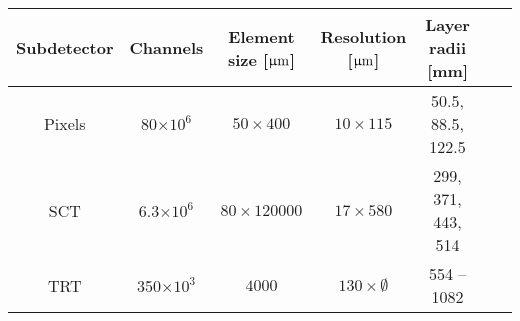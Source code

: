 \begin{tabular}{c|cccccc}
  Subdetector & Channels           & Element size [$\upmu\text{m}$] & Resolution [$\upmu\text{m}$] & Layer radii [mm]   \\
  \hline
  Pixels      & 80$\times 10^{6}$  & $50 \times 400$          & $10 \times 115$        & 50.5, 88.5, 122.5  \\
  SCT         & 6.3$\times 10^{6}$ & $80 \times 120000$       & $17 \times 580$        & 299, 371, 443, 514 \\
  TRT         & 350$\times 10^{3}$ & $4000$                   & $130 \times \emptyset$ & 554 -- 1082        \\
\end{tabular}

